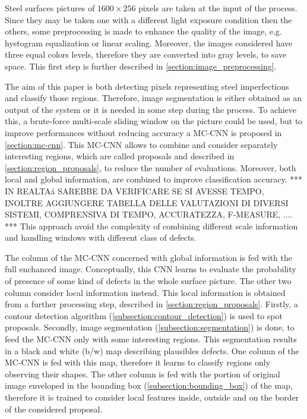     \par{
        Steel surfaces pictures of $1600\times 256$ pixels are taken at the input of the process. Since they may be taken one with a different light exposure condition then the others, some preprocessing is made to enhance the quality of the image, e.g. hystogram equalization or linear scaling. Moreover, the images considered have three equal colors levels, therefore they are converted into gray levels, to save space. This first step is further described in \ref{section:image_preprocessing}.
    }
    \par{
        The aim of this paper is both detecting pixels representing steel imperfections and classify those regions. Therefore, image segmentation is either obtained as an output of the system or it is needed in some step during the process. To achieve this, a brute-force multi-scale sliding window on the picture could be used, but to improve performances without reducing accuracy a MC-CNN is proposed in \ref{section:mc-cnn}. This MC-CNN allows to combine and consider separately interesting regions, which are called proposals and described in \ref{section:region_proposals}, to reduce the number of evaluations. Moreover, both local and global information, are combined to improve classification accuracy. *** IN REALTAá SAREBBE DA VERIFICARE SE SI AVESSE TEMPO, INOLTRE AGGIUNGERE TABELLA DELLE VALUTAZIONI DI DIVERSI SISTEMI, COMPRENSIVA DI TEMPO, ACCURATEZZA, F-MEASURE, .... *** This approach avoid the complexity of combining different scale information and handling windows with different class of defects.
    }
    \par{
        The column of the MC-CNN concerned with global information is fed with the full enchanced image. Conceptually, this CNN learns to evaluate the probability of presence of some kind of defects in the whole surface picture. The other two column consider local information instead. This local information is obtained from a further processing step, described in \ref{section:region_proposals}. Firstly, a contour detection algorithm (\ref{subsection:contour_detection}) is used to spot proposals. Secondly, image segmentation (\ref{subsection:segmentation}) is done, to feed the MC-CNN only with some interesting regions. This segmentation results in a black and white (b/w) map describing plausibles defects. One column of the MC-CNN is fed with this map, therefore it learns to classify regions only observing their shapes. The other column is fed with the portion of original image enveloped in the bounding box (\ref{subsection:bounding_box}) of the map, therefore it is trained to consider local features inside, outside and on the border of the considered proposal.
    }
